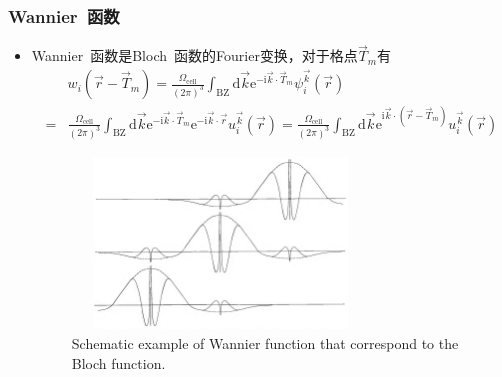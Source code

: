 {\frame
{
	\frametitle{\textrm{Wannier~}函数}
	\begin{itemize}
		\item \textrm{Wannier~}函数是\textrm{Bloch~}函数的\textrm{Fourier}变换，对于格点$\vec T_m$有
			\begin{displaymath}
				\begin{aligned}
					&w_i(\vec r-\vec T_m)=\frac{\Omega_{\mathrm{cell}}}{(2\pi)^3}\int_{\mathrm{BZ}}\mathrm{d}\vec k\mathrm{e}^{-\mathrm{i}\vec k\cdot\vec T_m}\psi_i^{\vec k}(\vec r)\\
					=&\frac{\Omega_{\mathrm{cell}}}{(2\pi)^3}\int_{\mathrm{BZ}}\mathrm{d}\vec k\mathrm{e}^{-\mathrm{i}\vec k\cdot\vec T_m}\mathrm{e}^{-\mathrm{i}\vec k\cdot\vec r}u_i^{\vec k}(\vec r)=\frac{\Omega_{\mathrm{cell}}}{(2\pi)^3}\int_{\mathrm{BZ}}\mathrm{d}\vec k\mathrm{e}^{\mathrm{i}\vec k\cdot(\vec r-\vec T_m)}u_i^{\vec k}(\vec r)
				\end{aligned}
			\end{displaymath}
\begin{figure}[h!]
\centering
\vspace*{-0.6in}
\includegraphics[height=1.8in,width=3.1in,viewport=0 0 1400 1000,clip]{Figures/Wannier_function.png}
\caption{\tiny \textrm{Schematic example of Wannier function that correspond to the Bloch function.}}%
\label{Wannier-function}
\end{figure} 
	\end{itemize}
}

}
